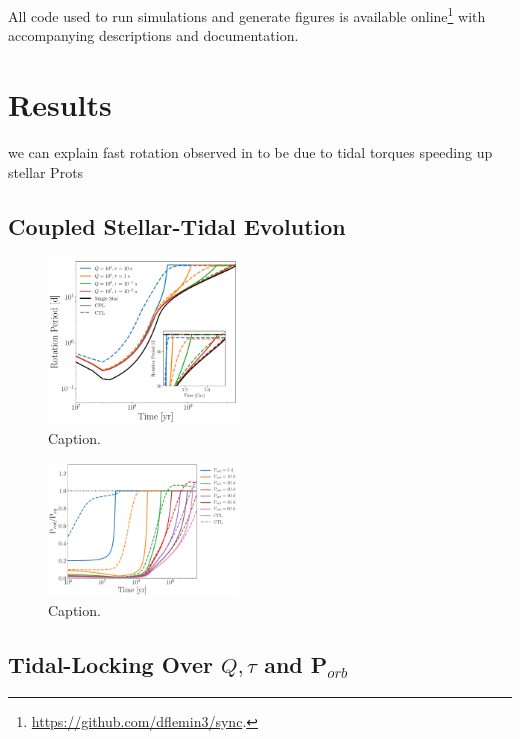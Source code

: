 \documentclass[twocolumn]{aastex61}
\begin{document}
All code used to run simulations and generate figures is available online\footnote{\href{https://github.com/dflemin3/sync}{https://github.com/dflemin3/sync}.} with accompanying descriptions and documentation.


\section{Results} \label{sec:results}

we can explain fast rotation observed in \citet{Meibom2007} to be due to tidal torques speeding up stellar Prots


\subsection{Coupled Stellar-Tidal Evolution}

\begin{figure}
	\includegraphics[width=0.45\textwidth]{../Plots/example.pdf}
   \caption{Caption.}%
    \label{fig:coupledExample}%
\end{figure}

\begin{figure}
	\includegraphics[width=0.45\textwidth]{../Plots/eqPer.pdf}
   \caption{Caption.}%
    \label{fig:eqPer}%
\end{figure}

\subsection{Tidal-Locking Over $Q,\tau$ and P$_{orb}$}
\end{document}
